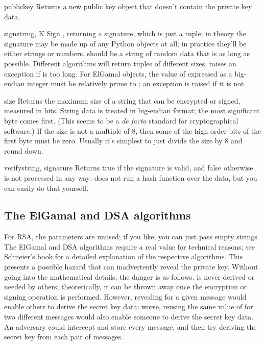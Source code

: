 \documentclass{howto}
\begin{document}
\begin{funcdesc}{publickey}{}
Returns a new public key object that doesn't contain the private key
data. 
\end{funcdesc}

\begin{funcdesc}{sign}{string, K}
Sign , returning a signature, which is just a tuple; in
theory the signature may be made up of any Python objects at all; in
practice they'll be either strings or numbers.   should be a
string of random data that is as long as possible.  Different algorithms
will return tuples of different sizes.   raises an
exception if  is too long.  For ElGamal objects, the value
of  expressed as a big-endian integer must be relatively prime to
; an exception is raised if it is not.
\end{funcdesc}

\begin{funcdesc}{size}{}
Returns the maximum size of a string that can be encrypted or signed,
measured in bits.  String data is treated in big-endian format; the most
significant byte comes first.  (This seems to be a \emph{de facto} standard
for cryptographical software.)  If the size is not a multiple of 8, then
some of the high order bits of the first byte must be zero.  Usually
it's simplest to just divide the size by 8 and round down.
\end{funcdesc}

\begin{funcdesc}{verify}{string, signature}
Returns true if the signature is valid, and false otherwise.
 is not processed in any way;  does
not run a hash function over the data, but you can easily do that yourself.
\end{funcdesc}

\subsection{The ElGamal and DSA algorithms}
For RSA, the  parameters are unused; if you like, you can just
pass empty strings.  The ElGamal and DSA algorithms require a real
 value for technical reasons; see Schneier's book for a detailed
explanation of the respective algorithms.  This presents a possible
hazard that can  
inadvertently reveal the private key.  Without going into the
mathematical details, the danger is as follows.  is never derived
or needed by others; theoretically, it can be thrown away once the
encryption or signing operation is performed.  However, revealing
 for a given message would enable others to derive the secret key
data; worse, reusing the same value of  for two different
messages would also enable someone to derive the secret key data.  An
adversary could intercept and store every message, and then try deriving
the secret key from each pair of messages.
\end{document}
